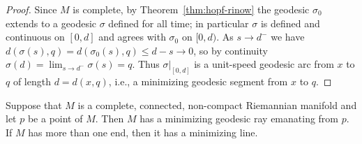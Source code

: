 \begin{proof}
Since $M$ is complete, by Theorem~\ref{thm:hopf-rinow} the geodesic
$\sigma_0$ extends to a geodesic $\sigma$ defined for all time; in
particular $\sigma$ is defined and continuous on $[0,d]$ and agrees
with $\sigma_0$ on $[0,d)$. As $s\rightarrow d^-$ we have
$d(\sigma(s),q)=d(\sigma_0(s),q)\le d-s\rightarrow 0$, so by
continuity $\sigma(d)=\lim_{s\rightarrow d^-}\sigma(s)=q$. Thus
$\sigma|_{[0,d]}$ is a unit-speed geodesic arc from $x$ to $q$ of
length $d=d(x,q)$, i.e., a minimizing geodesic segment from $x$ to
$q$.
\end{proof}

\begin{lemma}
\label{lem:ends-exist}
\label{ends}
\leanok
{}
Suppose that $M$ is a complete, connected, non-compact Riemannian
manifold and let $p$ be a point of $M$. Then $M$ has a minimizing
geodesic ray emanating from $p$. If $M$ has more than one end, then
it has a minimizing line.
\end{lemma}


